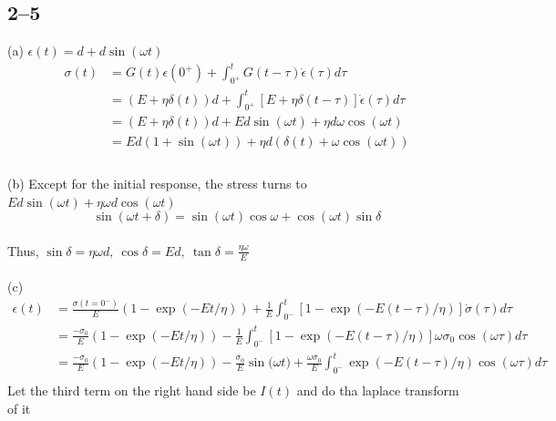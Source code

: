 \subsection*{2--5}
(a) $\epsilon(t)=d+d\sin(\omega t)$
\begin{align*}
    \sigma(t) &= G(t)\epsilon(0^+)+\int^t_{0^+}G(t-\tau)\dot\epsilon(\tau)d\tau \\
    &=(E+\eta\delta(t))d+\int^t_{0^+}[E+\eta\delta(t-\tau)]\dot\epsilon(\tau)d\tau \\
    &= (E+\eta\delta(t))d+Ed\sin(\omega t) +\eta d \omega\cos (\omega t) \\
    &= Ed(1+\sin(\omega t))+\eta d(\delta(t) + \omega \cos(\omega t)) \\
\end{align*}
\\
(b) Except for the initial response, the stress turns to $Ed\sin(\omega t)+\eta\omega d\cos(\omega t) $
\begin{equation*}
    \sin(\omega t+\delta)=\sin(\omega t)\cos \omega+\cos(\omega t) \sin \delta
\end{equation*} \\
Thus, $\sin\delta =\eta \omega d,\ \cos \delta = Ed ,\ \tan\delta=\frac{\eta\omega}{E}$ \\
\\
(c) 
\begin{align*}
    \epsilon(t) &= \frac{\sigma(t=0^-)}{E}(1-\exp{(-Et/\eta)})+\frac1E\int^t_{0^-}[1-\exp(-E(t-\tau)/\eta)]\dot\sigma(\tau)d\tau \\
    &= \frac{-\sigma_0}{E}(1-\exp{(-Et/\eta)})-\frac1E\int^t_{0^-}[1-\exp(-E(t-\tau)/\eta)]\omega \sigma_0 \cos{(\omega \tau)}d\tau  \\
    &= \frac{-\sigma_0}{E}(1-\exp{(-Et/\eta)})-\frac{\sigma_0}E\sin{(\omega t})+\frac{\omega \sigma_0}{E}\int^t_{0^-}\exp(-E(t-\tau)/\eta) \cos{(\omega \tau)}d\tau \\ 
\end{align*}
Let the third term on the right hand side be $I(t)$ and do tha laplace transform of it

